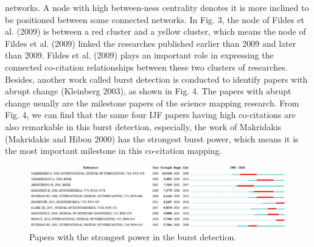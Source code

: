 \documentclass[11pt,a4paper]{elsarticle} %
\begin{document}
networks. A node with high between-ness centrality denotes it is more
inclined to be positioned between some connected networks. In Fig. 3,
the node of Fildes et al. (2009) is between a red cluster and a yellow
cluster, which means the node of Fildes et al. (2009) linked the
researches published earlier than 2009 and later than 2009. Fildes et
al. (2009) plays an important role in expressing the connected
co-citation relationships between these two clusters of researches.
Besides, another work called burst detection is conducted to identify
papers with abrupt change (Kleinberg 2003), as shown in Fig. 4. The
papers with abrupt change usually are the milestone papers of the
science mapping research. From Fig. 4, we can find that the same four
IJF papers having high co-citations are also remarkable in this burst
detection, especially, the work of Makridakis (Makridakis and Hibon
2000) has the strongest burst power, which means it is the most
important milestone in this co-citation mapping.

\begin{figure}[htbp]
\centering
\includegraphics[scale=0.5]{fig.4.eps}
\caption{Papers with the strongest power in the burst detection. }
\end{figure}
\end{document}
